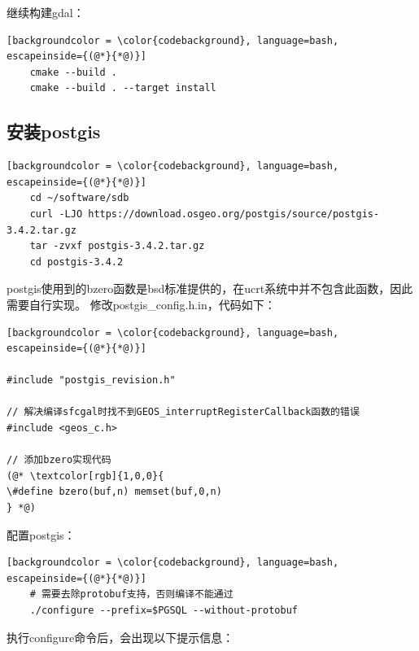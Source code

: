 继续构建gdal：

\begin{lstlisting}[backgroundcolor = \color{codebackground}, language=bash, escapeinside={(@*}{*@)}]
	cmake --build .
	cmake --build . --target install
\end{lstlisting}

\subsection{安装postgis}
\begin{lstlisting}[backgroundcolor = \color{codebackground}, language=bash, escapeinside={(@*}{*@)}]
	cd ~/software/sdb
	curl -LJO https://download.osgeo.org/postgis/source/postgis-3.4.2.tar.gz
	tar -zvxf postgis-3.4.2.tar.gz
	cd postgis-3.4.2
\end{lstlisting}



postgis使用到的bzero函数是bsd标准提供的，在ucrt系统中并不包含此函数，因此需要自行实现。
修改postgis\_config.h.in，代码如下：

\begin{lstlisting}[backgroundcolor = \color{codebackground}, language=bash, escapeinside={(@*}{*@)}]

#include "postgis_revision.h"

// 解决编译sfcgal时找不到GEOS_interruptRegisterCallback函数的错误 
#include <geos_c.h>

// 添加bzero实现代码
(@* \textcolor[rgb]{1,0,0}{
\#define bzero(buf,n) memset(buf,0,n)
} *@)
\end{lstlisting}


配置postgis：

\begin{lstlisting}[backgroundcolor = \color{codebackground}, language=bash, escapeinside={(@*}{*@)}]
	# 需要去除protobuf支持，否则编译不能通过
	./configure --prefix=$PGSQL --without-protobuf
\end{lstlisting}

执行configure命令后，会出现以下提示信息：

